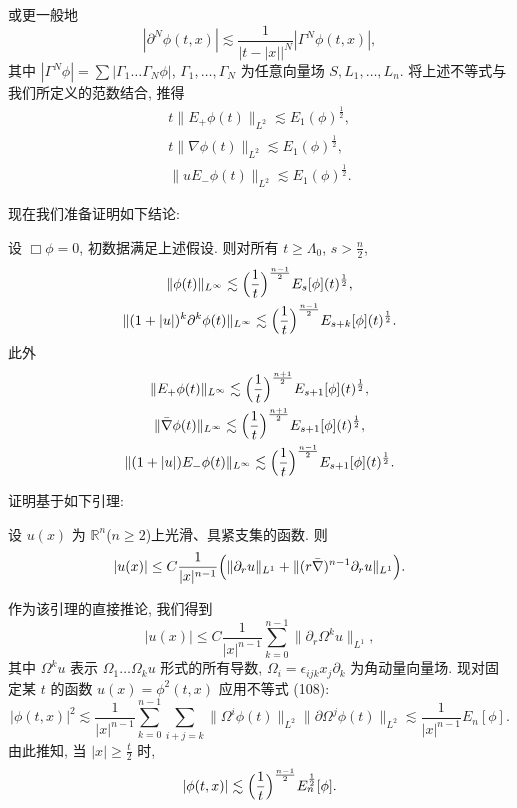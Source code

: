 或更一般地
\begin{equation}
|\partial^N\phi(t,x)|\lesssim\frac1{|t-|x||^N}|\Gamma^N\phi(t,x)|,\end{equation}
其中 $|\Gamma^N\phi|=\sum|\Gamma_1\ldots\Gamma_N\phi|$, $\Gamma_1,\ldots,\Gamma_N$ 为任意向量场 $S,L_1,\ldots,L_n$.
将上述不等式与我们所定义的范数结合, 推得
\begin{gather}
t\|E_+\phi(t)\|_{L^2}\lesssim E_1(\phi)^{\frac12},\\
t\|\nabla\phi(t)\|_{L^2}\lesssim E_1(\phi)^{\frac12},\\
\|uE_-\phi(t)\|_{L^2}\lesssim E_1(\phi)^{\frac12}.\end{gather}

现在我们准备证明如下结论:
\begin{proposition}\label{prop:4.15}
设 $\Box\phi=0$, 初数据满足上述假设. 则对所有 $t\geq\Lambda_0$, $s>\frac n2$,
\begin{gather}
\|\phi(t)\|_{L^\infty}\lesssim\Bigl(\frac1t\Bigr)^{\frac{n-1}{2}}E_s[\phi](t)^{\frac12},\\
\|(1+|u|)^k\partial^k\phi(t)\|_{L^\infty}\lesssim\Bigl(\frac1t\Bigr)^{\frac{n-1}{2}}E_{s+k}[\phi](t)^{\frac12}.\end{gather}
此外
\begin{gather}
\|E_+\phi(t)\|_{L^\infty}\lesssim\Bigl(\frac1t\Bigr)^{\frac{n+1}{2}}E_{s+1}[\phi](t)^{\frac12},\\
\|\bar\nabla\phi(t)\|_{L^\infty}\lesssim\Bigl(\frac1t\Bigr)^{\frac{n+1}{2}}E_{s+1}[\phi](t)^{\frac12},\\
\|(1+|u|)E_-\phi(t)\|_{L^\infty}\lesssim\Bigl(\frac1t\Bigr)^{\frac{n-1}{2}}E_{s+1}[\phi](t)^{\frac12}.\end{gather}
\end{proposition}

证明基于如下引理:
\begin{lemma}\label{lem:4.16}
设 $u(x)$ 为 $\mathbb{R}^n$($n\geq 2$)上光滑、具紧支集的函数. 则
\begin{equation}
|u(x)|\leq C\frac1{|x|^{n-1}}\Bigl(\|\partial_r u\|_{L^1}+\|(r\bar\nabla)^{n-1}\partial_r u\|_{L^1}\Bigr).\end{equation}
\end{lemma}

作为该引理的直接推论, 我们得到
\begin{equation}
|u(x)|\leq C\frac1{|x|^{n-1}}\sum_{k=0}^{n-1}\|\partial_r\Omega^k u\|_{L^1},\end{equation}
其中 $\Omega^k u$ 表示 $\Omega_1\ldots\Omega_k u$ 形式的所有导数, $\Omega_i=\epsilon_{ijk}x_j\partial_k$ 为角动量向量场. 现对固定某 $t$ 的函数 $u(x)=\phi^2(t,x)$ 应用不等式 (108):
\begin{equation}
|\phi(t,x)|^2\lesssim\frac1{|x|^{n-1}}\sum_{k=0}^{n-1}\sum_{i+j=k}\|\Omega^i\phi(t)\|_{L^2}\|\partial\Omega^j\phi(t)\|_{L^2}\lesssim\frac1{|x|^{n-1}}E_n[\phi].\end{equation}
由此推知, 当 $|x|\geq\frac t2$ 时,
\begin{equation}
|\phi(t,x)|\lesssim\Bigl(\frac1t\Bigr)^{\frac{n-1}{2}}E_n^{\frac12}[\phi].\end{equation}

